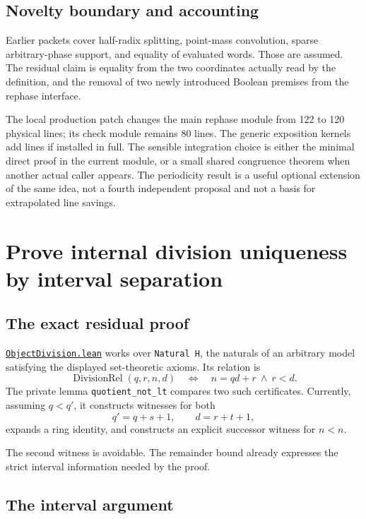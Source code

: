\documentclass[11pt,letterpaper]{article}
\newcommand{\code}[1]{{\small\urlstyle{tt}\nolinkurl{#1}}}
\newcommand{\source}[2]{\href{https://github.com/VladimirReshetnikov/ProveIt/blob/f00ba53b331833c6cb64707bd90e48489e5610f5/#1}{#2}}
\newcommand{\module}[1]{\code{#1.lean}}
\begin{document}
\subsection{Novelty boundary and accounting}

Earlier packets cover half-radix splitting, point-mass convolution, sparse arbitrary-phase support, and equality of evaluated words. Those are assumed. The residual claim is equality from the two coordinates actually read by the definition, and the removal of two newly introduced Boolean premises from the rephase interface.

The local production patch changes the main rephase module from 122 to 120 physical lines; its check module remains 80 lines. The generic exposition kernels add lines if installed in full. The sensible integration choice is either the minimal direct proof in the current module, or a small shared congruence theorem when another actual caller appears. The periodicity result is a useful optional extension of the same idea, not a fourth independent proposal and not a basis for extrapolated line savings.

\section{Prove internal division uniqueness by interval separation}
\label{sec:division}

\subsection{The exact residual proof}

\source{Computability/DiophantineConsistency/Lean/DiophantineConsistency/ObjectDivision.lean}{\module{ObjectDivision}} works over \code{Natural H}, the naturals of an arbitrary model satisfying the displayed set-theoretic axioms. Its relation is
\[
 \operatorname{DivisionRel}(q,r,n,d)\quad\Longleftrightarrow\quad n=qd+r\ \land\ r<d.
\]
The private lemma \code{quotient_not_lt} compares two such certificates. Currently, assuming $q<q'$, it constructs witnesses for both
\[
 q'=q+s+1,\qquad d=r+t+1,
\]
expands a ring identity, and constructs an explicit successor witness for $n<n$.

The second witness is avoidable. The remainder bound already expresses the strict interval information needed by the proof.

\subsection{The interval argument}
\end{document}

